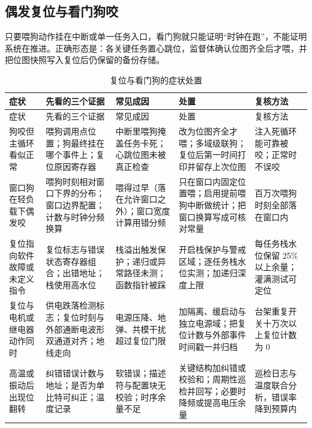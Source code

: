 \documentclass[12pt,a4paper,fontset=fandol]{ctexbook}
\begin{document}
\subsection{偶发复位与看门狗咬}

\begin{warning}[title={在中断里喂狗等于关掉监督}]
只要喂狗动作挂在中断或单一任务入口，看门狗就只能证明``时钟在跑''，不能证明系统在推进。正确形态是：各关键任务置心跳位，监督体确认位图齐全后才喂，并把位图快照写入复位后仍保留的备份存储。
\end{warning}

\begin{longtable}{>{\raggedright\arraybackslash\footnotesize}p{}>{\raggedright\arraybackslash\footnotesize}p{}>{\raggedright\arraybackslash\footnotesize}p{}>{\raggedright\arraybackslash\footnotesize}p{}>{\raggedright\arraybackslash\footnotesize}p{}}
\caption{复位与看门狗的症状处置}\label{tab:apC-reset} \\
\toprule
症状 & 先看的三个证据 & 常见成因 & 处置 & 复核方法 \\
\midrule
\endfirsthead
\toprule
症状 & 先看的三个证据 & 常见成因 & 处置 & 复核方法 \\
\midrule
\endhead
\bottomrule
\endfoot
\endlastfoot
狗咬但主循环看似正常 & 喂狗调用点位置；狗最终挂在哪个事件上；复位原因寄存器 & 中断里喂狗掩盖任务卡死；心跳位图未被真正检查 & 改为位图齐全才喂；多域级联狗；复位后第一时间打印并留存上次位图 & 注入死循环能可靠被咬；正常时不误咬 \\
窗口狗在轻负载下偶发咬 & 喂狗时刻相对窗口下界的分布；窗口边界配置；计数与时钟分频换算 & 喂得过早（落在允许窗口之外）；窗口宽度计算用错分频 & 只在窗口内固定位置喂；启用提前喂狗中断做统计；把窗口换算写成可核对常量 & 百万次喂狗时刻全部落在窗口内 \\
复位指向软件故障或未定义指令 & 复位标志与错误状态寄存器组合；出错地址；栈使用高水位 & 栈溢出触发保护；递归或异常路径未测；函数指针被踩 & 开启栈保护与警戒区域；逐任务栈水位实测；加递归深度上限 & 每任务栈水位保留 25\% 以上余量；灌满测试可定位 \\
复位与电机或继电器动作同时 & 供电跌落检测标志；复位时刻与外部通断电波形双通道对齐；地线走向 & 电源压降、地弹、共模干扰超过复位门限 & 加隔离、缓启动与独立电源域；把复位计数与外部事件时间戳一并归档 & 台架重复开关十万次以上复位计数为 0 \\
高温或振动后出现位翻转 & 纠错错误计数与地址；是否为单比特可纠正；温度记录 & 软错误；描述符与配置块无校验；时序余量不足 & 关键结构加纠错或校验和；周期性巡检并回写；必要时降频或提高电压余量 & 巡检日志与温度联合分析，错误率降到预算内 \\

\end{longtable}
\end{document}
